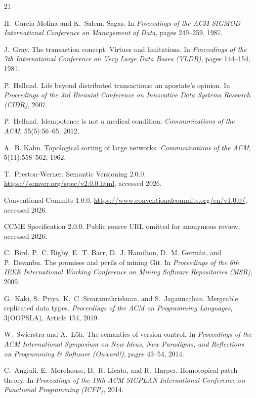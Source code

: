 \documentclass[10pt,conference]{IEEEtran}
\theoremstyle{definition}
\begin{document}
\vfuzz=2pt
\begin{thebibliography}{21}

H.~Garcia-Molina and K.~Salem.
Sagas.
In \emph{Proceedings of the ACM SIGMOD International Conference on
Management of Data}, pages 249--259, 1987.

J.~Gray.
The transaction concept: Virtues and limitations.
In \emph{Proceedings of the 7th International Conference on Very Large
Data Bases (VLDB)}, pages 144--154, 1981.

P.~Helland.
Life beyond distributed transactions: an apostate's opinion.
In \emph{Proceedings of the 3rd Biennial Conference on Innovative Data
Systems Research (CIDR)}, 2007.

P.~Helland.
Idempotence is not a medical condition.
\emph{Communications of the ACM}, 55(5):56--65, 2012.

A.~B. Kahn.
Topological sorting of large networks.
\emph{Communications of the ACM}, 5(11):558--562, 1962.

T.~Preston-Werner.
Semantic Versioning 2.0.0.
\url{https://semver.org/spec/v2.0.0.html}, accessed 2026.

Conventional Commits 1.0.0.
\url{https://www.conventionalcommits.org/en/v1.0.0/}, accessed 2026.

CCME Specification 2.0.0.
Public source URL omitted for anonymous review,
accessed 2026.

C.~Bird, P.~C. Rigby, E.~T. Barr, D.~J. Hamilton, D.~M. Germ\'an, and
P.~Devanbu.
The promises and perils of mining Git.
In \emph{Proceedings of the 6th IEEE International Working Conference
on Mining Software Repositories (MSR)}, 2009.

G.~Kaki, S.~Priya, K.~C. Sivaramakrishnan, and S.~Jagannathan.
Mergeable replicated data types.
\emph{Proceedings of the ACM on Programming Languages},
3(OOPSLA), Article 154, 2019.

W.~Swierstra and A.~L\"oh.
The semantics of version control.
In \emph{Proceedings of the ACM International Symposium on New Ideas,
New Paradigms, and Reflections on Programming \& Software (Onward!)},
pages 43--54, 2014.

C.~Angiuli, E.~Morehouse, D.~R. Licata, and R.~Harper.
Homotopical patch theory.
In \emph{Proceedings of the 19th ACM SIGPLAN International Conference
on Functional Programming (ICFP)}, 2014.


\end{thebibliography}
\end{document}
